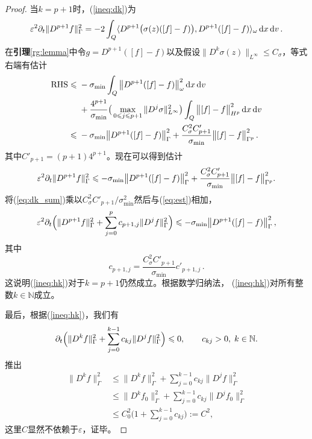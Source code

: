 \begin{proof}
  当$k=p+1$时，(\ref{ineq:dk})为
  \begin{equation}
    \varepsilon^2\partial_t\|D^{p+1} f\|^2_{\Gamma} = -2\int_Q \langle D^{p+1}\big(\sigma(z)(\left[ f \right]-f)\big),D^{p+1} ([f]-f) \rangle_{\omega}\mathop{}\!\mathrm{d} x\mathop{}\!\mathrm{d} v\,.
  \end{equation}
  在{\bf 引理}\ref{rg:lemma}中令$g = D^{p+1}([f] - f)$以及假设$\|D^k\sigma(z)\|_{L^\infty}\le C_\sigma$，等式右端有估计
  \begin{equation}
    \begin{split}
      \mathrm{RHS}
      \leqslant {} & -\sigma_{\mathrm{min}}\int_Q \big\|D^{p+1}([f] - f)\big\|^2_\omega\mathop{}\!\mathrm{d} x\mathop{}\!\mathrm{d} v
      \\
      {} & + \frac{4^{p+1}}{\sigma_{\mathrm{min}}}\big(\max\limits_{0\leqslant j\leqslant p+1}\|D^{j} \sigma\|^2_{L^\infty}\big)\int_Q\big\|[f] - f\big\|_{H^{p}}^2\mathop{}\!\mathrm{d} x\mathop{}\!\mathrm{d} v
      \\
      \leqslant {} & -\sigma_{\mathrm{min}}\big\|D^{p+1}([f] - f)\big\|^2_{\Gamma} + \frac{C_\sigma^2 C'_{p+1}}{\sigma_{\mathrm{min}}}\big\|[f] - f\big\|^2_{\Gamma^{p}}\,.
    \end{split}
  \end{equation}
  其中$C'_{p+1} = (p+1)4^{p+1}$。现在可以得到估计
  \begin{equation}\label{eq:est}
    \varepsilon^2\partial_t\|D^{p+1} f\|^2_{\Gamma} \leqslant -\sigma_{\mathrm{min}}\big\|D^{p+1}([f] - f)\big\|^2_{\Gamma} + \frac{C_\sigma^2 C'_{p+1}}{\sigma_{\mathrm{min}}}\big\|[f] - f\big\|^2_{\Gamma^{p}}.
  \end{equation}
  将(\ref{eq:dk_sum})乘以$C_\sigma^2 C'_{p+1}/ \sigma_{\mathrm{min}}^2$然后与(\ref{eq:est})相加，
  \begin{equation}\label{f:k=p+1}
    \varepsilon^2\partial_t\Big(\|D^{p+1} f\|^2_{\Gamma} + \sum_{j=0}^{p} c_{p+1, j}\|D^j f\|^2_{\Gamma}\Big) \leqslant -\sigma_{\mathrm{min}}\big\|D^{p+1}([f] - f)\big\|^2_{\Gamma}\,,
  \end{equation}
  其中
  \begin{equation}
    c_{p+1, j} = \frac{C_\sigma^2 C'_{p+1}}{\sigma_{\mathrm{min}}}c'_{p+1, j}\,.
  \end{equation}
  这说明(\ref{ineq:hk})对于$k= p+1$仍然成立。根据数学归纳法， (\ref{ineq:hk})对所有整数$k\in\mathbb{N}$成立。

  最后，根据(\ref{ineq:hk})，我们有
  \begin{equation}
    \partial_t\Big(\|D^k f\|^2_{\Gamma} + \sum_{j=0}^{k-1} c_{kj}\|D^j f\|^2_{\Gamma}\Big) \leqslant 0, \qquad c_{kj}>0,\;k\in\mathbb{N}.
  \end{equation}
  推出
  \begin{equation}
    \begin{split}
      \|D^k f\|^2_{\Gamma}
      & \le\|D^k f\|^2_{\Gamma} + \sum_{j=0}^{k-1} c_{kj}\|D^j f\|^2_{\Gamma}
      \\
      & \le \|D^k f_0\|^2_{\Gamma} + \sum_{j=0}^{k-1} c_{kj}\|D^j f_0\|^2_{\Gamma}
      \\
      & \le C_0^2\Big(1 + \sum_{j=0}^{k-1} c_{kj}\Big) := C^2,
    \end{split}
  \end{equation}
  这里$C$显然不依赖于$\varepsilon$，证毕。
\end{proof}
